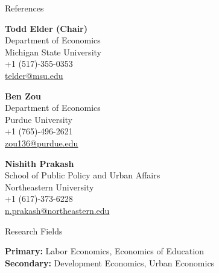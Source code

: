 \documentclass{resume} %
\begin{document}
\begin{rSection}{References}
	\vspace{.5em}
	\begin{minipage}{0.3\linewidth}
		{\bf Todd Elder (Chair)}\\
		Department of Economics\\
		Michigan State University\\
		+1 (517)-355-0353\\
		\href{mailto:telder@msu.edu}{telder@msu.edu}\\
	\end{minipage}
	\hfill
	\begin{minipage}{0.3\linewidth}
		{\bf Ben Zou} \\
		Department of Economics\\
		Purdue University\\
		+1 (765)-496-2621\\
		\href{mailto:zou136@purdue.edu}{zou136@purdue.edu}\\
	\end{minipage}
	\hfill
	\begin{minipage}{0.38\linewidth}
		{\bf Nishith Prakash}\\
		School of Public Policy and Urban Affairs \\
		Northeastern University\\
		+1 (617)-373-6228\\
		\href{mailto:n.prakash@northeastern.edu}{n.prakash@northeastern.edu}\\
	\end{minipage}


	
\end{rSection}




\begin{rSection}{Research Fields}\itemsep -2pt
	
	{\bf Primary:} Labor Economics, Economics of Education\\
	{\bf Secondary:} Development Economics, Urban Economics
	
\end{rSection}
\end{document}
